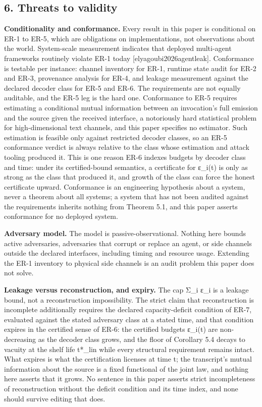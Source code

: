 \documentclass[
  11pt,
]{article}
\begin{document}
\subsection{6. Threats to validity}\label{threats-to-validity}

\textbf{Conditionality and conformance.} Every result in this paper is
conditional on ER-1 to ER-5, which are obligations on implementations,
not observations about the world. System-scale measurement indicates
that deployed multi-agent frameworks routinely violate ER-1 today
{[}elyagoubi2026agentleak{]}. Conformance is testable per instance:
channel inventory for ER-1, runtime state audit for ER-2 and ER-3,
provenance analysis for ER-4, and leakage measurement against the
declared decoder class for ER-5 and ER-6. The requirements are not
equally auditable, and the ER-5 leg is the hard one. Conformance to ER-5
requires estimating a conditional mutual information between an
invocation's full emission and the source given the received interface,
a notoriously hard statistical problem for high-dimensional text
channels, and this paper specifies no estimator. Such estimation is
feasible only against restricted decoder classes, so an ER-5 conformance
verdict is always relative to the class whose estimation and attack
tooling produced it. This is one reason ER-6 indexes budgets by decoder
class and time: under its certified-bound semantics, a certificate for
ε\_i(t) is only as strong as the class that produced it, and growth of
the class can force the honest certificate upward. Conformance is an
engineering hypothesis about a system, never a theorem about all
systems; a system that has not been audited against the requirements
inherits nothing from Theorem 5.1, and this paper asserts conformance
for no deployed system.

\textbf{Adversary model.} The model is passive-observational. Nothing
here bounds active adversaries, adversaries that corrupt or replace an
agent, or side channels outside the declared interfaces, including
timing and resource usage. Extending the ER-1 inventory to physical side
channels is an audit problem this paper does not solve.

\textbf{Leakage versus reconstruction, and expiry.} The cap Σ\_i ε\_i is
a leakage bound, not a reconstruction impossibility. The strict claim
that reconstruction is incomplete additionally requires the declared
capacity-deficit condition of ER-7, evaluated against the stated
adversary class at a stated time, and that condition expires in the
certified sense of ER-6: the certified budgets ε\_i(t) are
non-decreasing as the decoder class grows, and the floor of Corollary
5.4 decays to vacuity at the shelf life t*\_lin while every structural
requirement remains intact. What expires is what the certification
licenses at time t; the transcript's mutual information about the source
is a fixed functional of the joint law, and nothing here asserts that it
grows. No sentence in this paper asserts strict incompleteness of
reconstruction without the deficit condition and its time index, and
none should survive editing that does.
\end{document}
